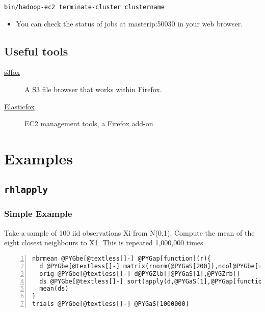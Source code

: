 \documentclass[letterpaper,10pt,english]{manual}
\begin{document}
\begin{Verbatim}[commandchars=@\[\]]
bin/hadoop-ec2 terminate-cluster clustername
\end{Verbatim}
\begin{itemize}
\item {} 
You can check the status of jobs at masterip:50030 in your web browser.

\end{itemize}


\section{Useful tools}
\begin{description}
\item[\href{http://www.s3fox.net/}{s3fox}]
A S3 file browser that works within Firefox.

\item[\href{http://sourceforge.net/projects/elasticfox/}{Elasticfox}]
EC2 management tools, a Firefox add-on.

\end{description}

\resetcurrentobjects
\hypertarget{--doc-examples}{}

\chapter{Examples}


\section{\texttt{rhlapply}}


\subsection{Simple Example}

Take a sample of 100 iid observations Xi from N(0,1). Compute the mean of the eight closest neighbours to X1. This is repeated 1,000,000 times.

\begin{Verbatim}[commandchars=@\[\],numbers=left,firstnumber=1,stepnumber=1]
nbrmean @PYGbe[@textless[]-] @PYGap[function](r){
  d @PYGbe[@textless[]-] matrix(rnorm(@PYGaS[200]),ncol@PYGbe[=]@PYGaS[2])
  orig @PYGbe[@textless[]-] d@PYGZlb[]@PYGaS[1],@PYGZrb[]
  ds @PYGbe[@textless[]-] sort(apply(d,@PYGaS[1],@PYGap[function](r) sqrt(sum((r@PYGbe[-]orig)@PYGbe[@textasciicircum[]]@PYGaS[2])))@PYGZlb[]@PYGaS[-1]@PYGZrb[])@PYGZlb[]@PYGaS[1]:@PYGaS[8]@PYGZrb[]
  mean(ds)
}
trials @PYGbe[@textless[]-] @PYGaS[1000000]
\end{Verbatim}
\end{document}
